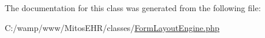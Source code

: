\-The documentation for this class was generated from the following file\-:\begin{DoxyCompactItemize}
\item 
\-C\-:/wamp/www/\-Mitos\-E\-H\-R/classes/\hyperlink{_form_layout_engine_8php}{\-Form\-Layout\-Engine.\-php}\end{DoxyCompactItemize}
